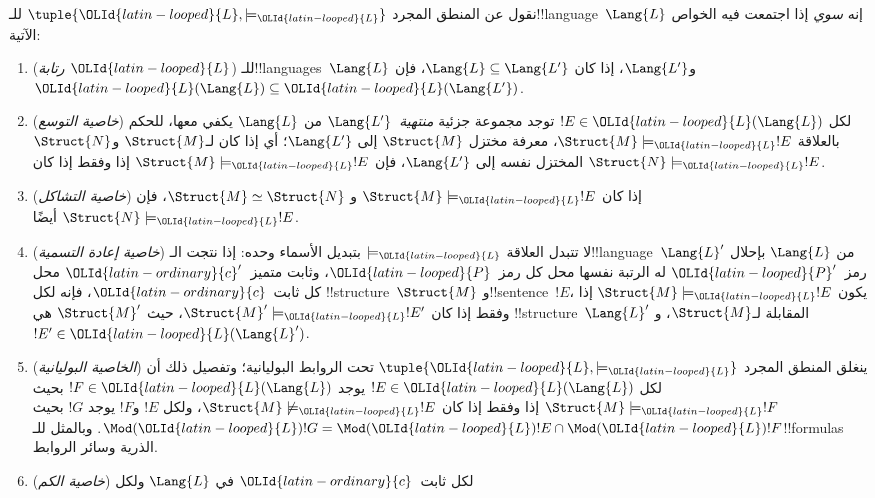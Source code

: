 \documentclass[../../../include/open-logic-section]{subfiles}
\begin{document}
\begin{defn}
نقول عن المنطق المجرد $\tuple{{\OLId{latin-looped}{L}},\models_{\OLId{latin-looped}{L}}}$ للـ!!{language}~$\Lang{L}$
إنه \emph{سوي} إذا اجتمعت فيه الخواص الآتية:
\begin{enumerate}
\item (\emph{رتابة ${\OLId{latin-looped}{L}}$}) للـ!!{language}s~$\Lang{L}$ و$\Lang{L'}$،
  إذا كان $\Lang{L} \subseteq \Lang{L'}$، فإن
  ${\OLId{latin-looped}{L}}(\Lang{L}) \subseteq {\OLId{latin-looped}{L}}(\Lang{L'})$.
\item (\emph{خاصية التوسع}) لكل $!E \in {\OLId{latin-looped}{L}}(\Lang{L})$ توجد مجموعة
  جزئية \emph{منتهية}~$\Lang{L'}$ من $\Lang{L}$ يكفي معها، للحكم بالعلاقة
  $\Struct{M} \models_{\OLId{latin-looped}{L}} !E$، معرفة مختزل $\Struct{M}$ إلى
  $\Lang{L'}$؛ أي إذا كان لـ$\Struct{M}$ و$\Struct{N}$ المختزل نفسه
  إلى $\Lang{L'}$، فإن $\Struct{M} \models_{\OLId{latin-looped}{L}} !E$ إذا وفقط إذا كان
  $\Struct{N} \models_{\OLId{latin-looped}{L}} !E$.
\item (\emph{خاصية التشاكل}) إذا كان $\Struct{M} \models_{\OLId{latin-looped}{L}} !E$ و
  $\Struct{M} \simeq \Struct{N}$، فإن $\Struct{N} \models_{\OLId{latin-looped}{L}} !E$ أيضًا.
\item (\emph{خاصية إعادة التسمية}) لا تتبدل العلاقة $\models_{\OLId{latin-looped}{L}}$ بتبديل
  الأسماء وحده: إذا نتجت الـ!!{language}~$\Lang{L}'$ من $\Lang{L}$ بإحلال
  رمز~${\OLId{latin-looped}{P}}'$ له الرتبة نفسها محل كل رمز~${\OLId{latin-looped}{P}}$، وثابت متميز~${\OLId{latin-ordinary}{c}}'$ محل كل
  ثابت~${\OLId{latin-ordinary}{c}}$، فإنه لكل !!{structure}~$\Struct{M}$ و!!{sentence}~$!E$،
  يكون $\Struct{M} \models_{\OLId{latin-looped}{L}} !E$ إذا وفقط إذا كان
  $\Struct{M}' \models_{\OLId{latin-looped}{L}} !E'$، حيث $\Struct{M}'$ هي
  !!{structure}~$\Lang{L}'$ المقابلة لـ$\Struct{M}$، و
  $!E' \in {\OLId{latin-looped}{L}}(\Lang{L}')$.
\item (\emph{الخاصية البوليانية}) ينغلق المنطق المجرد
  $\tuple{{\OLId{latin-looped}{L}},\models_{\OLId{latin-looped}{L}}}$ تحت الروابط البوليانية؛ وتفصيل ذلك أن لكل
  $!E \in {\OLId{latin-looped}{L}}(\Lang{L})$ يوجد $!F \in {\OLId{latin-looped}{L}}(\Lang{L})$ بحيث
  $\Struct{M} \models_{\OLId{latin-looped}{L}} !F$ إذا وفقط إذا كان
  $\Struct{M} \not\models_{\OLId{latin-looped}{L}} !E$، ولكل $!E$ و$!F$ يوجد $!G$ بحيث
  $\Mod({\OLId{latin-looped}{L}}){!G}=\Mod({\OLId{latin-looped}{L}}){!E} \cap \Mod({\OLId{latin-looped}{L}}){!F}$. وبالمثل للـ!!{formula}s
  الذرية وسائر الروابط.
\item (\emph{خاصية الكم}) لكل ثابت~${\OLId{latin-ordinary}{c}}$ في $\Lang{L}$ ولكل

\end{enumerate}
\end{defn}
\end{document}
